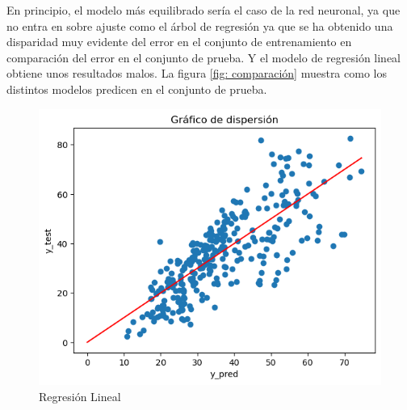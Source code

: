 \noindent En principio, el modelo más equilibrado sería el caso de la red neuronal, ya que no entra en sobre ajuste como el árbol de regresión ya que se ha obtenido una disparidad muy evidente del error en el conjunto de entrenamiento en comparación del error en el conjunto de prueba. Y el modelo de regresión lineal obtiene unos resultados malos. La figura \ref{fig: comparación} muestra como los distintos modelos predicen en el conjunto de prueba.

\begin{figure}[h]
  \centering
  \begin{minipage}{0.32\textwidth}
   
    \includegraphics[width=\textwidth]{Documentos Extra/Imagenes/Datos PruebasRegresionLineal.png}
    \caption{Regresión Lineal}
    \label{fig:regresion_lineal}
  \end{minipage}
  \hfill
  \begin{minipage}{0.32\textwidth}
 

\end{minipage}
\end{figure}
